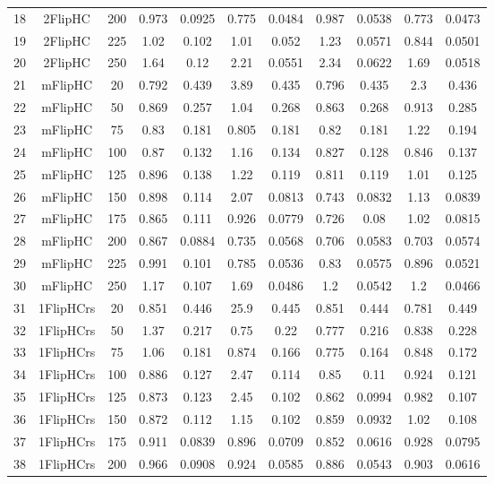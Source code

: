 \begin{table}[hbtp]
\begin{tabular}{|ccccccccccc|}
  18 & 2FlipHC &  200 & 0.973 & 0.0925 & 0.775 & 0.0484 & 0.987 & 0.0538 & 0.773 & 0.0473 \\
  19 & 2FlipHC &  225 & 1.02 & 0.102 & 1.01 & 0.052 & 1.23 & 0.0571 & 0.844 & 0.0501 \\
  20 & 2FlipHC &  250 & 1.64 & 0.12 & 2.21 & 0.0551 & 2.34 & 0.0622 & 1.69 & 0.0518 \\
  21 & mFlipHC &   20 & 0.792 & 0.439 & 3.89 & 0.435 & 0.796 & 0.435 &  2.3 & 0.436 \\
  22 & mFlipHC &   50 & 0.869 & 0.257 & 1.04 & 0.268 & 0.863 & 0.268 & 0.913 & 0.285 \\
  23 & mFlipHC &   75 & 0.83 & 0.181 & 0.805 & 0.181 & 0.82 & 0.181 & 1.22 & 0.194 \\
  24 & mFlipHC &  100 & 0.87 & 0.132 & 1.16 & 0.134 & 0.827 & 0.128 & 0.846 & 0.137 \\
  25 & mFlipHC &  125 & 0.896 & 0.138 & 1.22 & 0.119 & 0.811 & 0.119 & 1.01 & 0.125 \\
  26 & mFlipHC &  150 & 0.898 & 0.114 & 2.07 & 0.0813 & 0.743 & 0.0832 & 1.13 & 0.0839 \\
  27 & mFlipHC &  175 & 0.865 & 0.111 & 0.926 & 0.0779 & 0.726 & 0.08 & 1.02 & 0.0815 \\
  28 & mFlipHC &  200 & 0.867 & 0.0884 & 0.735 & 0.0568 & 0.706 & 0.0583 & 0.703 & 0.0574 \\
  29 & mFlipHC &  225 & 0.991 & 0.101 & 0.785 & 0.0536 & 0.83 & 0.0575 & 0.896 & 0.0521 \\
  30 & mFlipHC &  250 & 1.17 & 0.107 & 1.69 & 0.0486 &  1.2 & 0.0542 &  1.2 & 0.0466 \\
  31 & 1FlipHCrs &   20 & 0.851 & 0.446 & 25.9 & 0.445 & 0.851 & 0.444 & 0.781 & 0.449 \\
  32 & 1FlipHCrs &   50 & 1.37 & 0.217 & 0.75 & 0.22 & 0.777 & 0.216 & 0.838 & 0.228 \\
  33 & 1FlipHCrs &   75 & 1.06 & 0.181 & 0.874 & 0.166 & 0.775 & 0.164 & 0.848 & 0.172 \\
  34 & 1FlipHCrs &  100 & 0.886 & 0.127 & 2.47 & 0.114 & 0.85 & 0.11 & 0.924 & 0.121 \\
  35 & 1FlipHCrs &  125 & 0.873 & 0.123 & 2.45 & 0.102 & 0.862 & 0.0994 & 0.982 & 0.107 \\
  36 & 1FlipHCrs &  150 & 0.872 & 0.112 & 1.15 & 0.102 & 0.859 & 0.0932 & 1.02 & 0.108 \\
  37 & 1FlipHCrs &  175 & 0.911 & 0.0839 & 0.896 & 0.0709 & 0.852 & 0.0616 & 0.928 & 0.0795 \\
  38 & 1FlipHCrs &  200 & 0.966 & 0.0908 & 0.924 & 0.0585 & 0.886 & 0.0543 & 0.903 & 0.0616 \\

\end{tabular}
\end{table}
